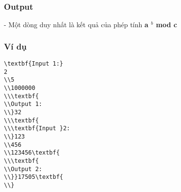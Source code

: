 \subsubsection{   Output  }

    - Một dòng duy nhất là kết quả của phép tính    \textbf{     a     $^      b     $     mod c    }

\subsubsection{   Ví dụ  }
\begin{verbatim}
\textbf{Input 1:}
2
\\5
\\1000000
\\\textbf{
\\Output 1:
\\}32
\\\textbf{
\\\textbf{Input }2:
\\}123
\\456
\\123456\textbf{
\\\textbf{
\\Output 2:
\\}}17505\textbf{
\\}\end{verbatim}
